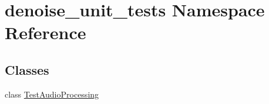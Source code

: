 \hypertarget{namespacedenoise__unit__tests}{\section{denoise\-\_\-unit\-\_\-tests Namespace Reference}
\label{namespacedenoise__unit__tests}
}
\subsection*{Classes}
\begin{DoxyCompactItemize}
\item 
class \hyperlink{classdenoise__unit__tests_1_1TestAudioProcessing}{Test\-Audio\-Processing}
\end{DoxyCompactItemize}
